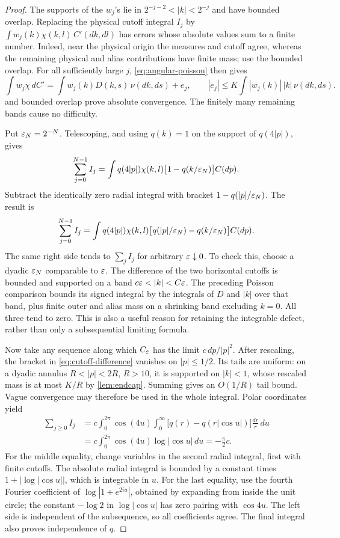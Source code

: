 \begin{proof}
The supports of the \(w_j\)'s lie in
\(2^{-j-2}<|k|<2^{-j}\) and have bounded overlap. Replacing the physical
cutoff integral \(I_j\) by
\(\int w_j(k)\chi(k,l)\,C'(dk,dl)\) has errors whose absolute values sum
to a finite number. Indeed, near the physical origin the measures and cutoff
agree, whereas the remaining physical and alias contributions have finite
mass; use the bounded overlap. For all sufficiently large \(j\),
\cref{eq:angular-poisson} then gives
\[
 \int w_j\chi\,dC'=\int w_j(k)D(k,s)\,\nu(dk,ds)+e_j,
 \qquad |e_j|\le K\int |w_j(k)|\,|k|\,\nu(dk,ds).
\]
 and bounded overlap prove
absolute convergence. The finitely many remaining bands cause no difficulty.

Put \(\varepsilon_N=2^{-N}\). Telescoping, and using \(q(k)=1\) on the support of
\(q(4|p|)\), gives
\[
 \sum_{j=0}^{N-1}I_j
 =\int q(4|p|)\chi(k,l)\bigl[1-q(k/\varepsilon_N)\bigr]C(dp).
\]
Subtract the identically zero radial integral with bracket
\(1-q(|p|/\varepsilon_N)\). The result is
\begin{equation}
 \label{eq:cutoff-difference}
 \sum_{j=0}^{N-1}I_j
 =\int q(4|p|)\chi(k,l)
       \bigl[q(|p|/\varepsilon_N)-q(k/\varepsilon_N)\bigr]C(dp).
\end{equation}
The same right side tends to \(\sum_jI_j\) for arbitrary
\(\varepsilon\downarrow0\). To check this, choose a dyadic \(\varepsilon_N\) comparable
to \(\varepsilon\). The difference of the two horizontal cutoffs is bounded and
supported on a band \(c\eps<|k|<C\eps\). The preceding Poisson comparison
bounds its signed integral by the integrals of \(D\) and \(|k|\) over that
band, plus finite outer and alias mass on a shrinking band excluding
\(k=0\). All three tend to zero. This is also a useful reason for retaining
the integrable defect, rather than only a subsequential limiting formula.

Now take any sequence along which \(C_\varepsilon\) has the limit
\(c\,dp/|p|^2\). After rescaling, the bracket in
\cref{eq:cutoff-difference} vanishes on \(|p|\le1/2\). Its tails are uniform:
on a dyadic annulus \(R<|p|<2R\), \(R>10\), it is supported on \(|k|<1\),
whose rescaled mass is at most \(K/R\) by \cref{lem:endcap}. Summing gives
an \(O(1/R)\) tail bound. Vague convergence may therefore be used in the
whole integral. Polar coordinates yield
\begin{align*}
 \sum_{j\ge0}I_j
 &=c\int_0^{2\pi}\cos(4u)
       \int_0^\infty\bigl[q(r)-q(r|\cos u|)\bigr]\frac{dr}{r}\,du\\
 &=c\int_0^{2\pi}\cos(4u)\log|\cos u|\,du
  =-\frac\pi2c.
\end{align*}
For the middle equality, change variables in the second radial integral,
first with finite cutoffs. The absolute radial integral is bounded by a
constant times \(1+|\log|\cos u||\), which is integrable in \(u\).
For the last equality, use the fourth Fourier coefficient of
\(\log|1+e^{2iu}|\), obtained by expanding from inside the unit circle; the
constant \(-\log2\) in \(\log|\cos u|\) has zero pairing with \(\cos4u\).
The left side is independent of the subsequence, so all coefficients agree.
The final integral also proves independence of \(q\).
\end{proof}

